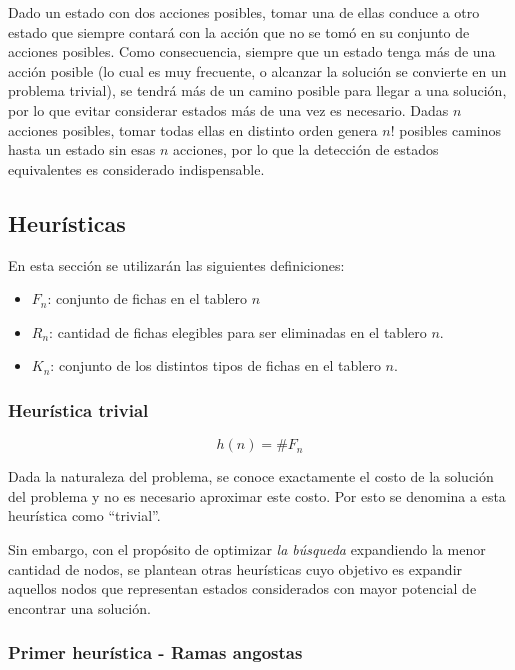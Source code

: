\documentclass[a4paper,10pt]{article}
\begin{document}
    Dado un estado con dos acciones posibles, tomar una de ellas conduce a otro estado que siempre contará con la acción que no se tomó en su conjunto de acciones posibles. Como consecuencia, siempre que un estado tenga más de una acción posible (lo cual es muy frecuente, o alcanzar la solución se convierte en un problema trivial), se tendrá más de un camino posible para llegar a una solución, por lo que evitar considerar estados más de una vez es necesario. Dadas $n$ acciones posibles, tomar todas ellas en distinto orden genera $n!$ posibles caminos hasta un estado sin esas $n$ acciones, por lo que la detección de estados equivalentes es considerado indispensable.

\subsection{Heurísticas}

    En esta sección se utilizarán las siguientes definiciones:

    \begin{itemize}
        \item $F_n$: conjunto de fichas en el tablero $n$
        \item $R_n$: cantidad de fichas elegibles para ser eliminadas en el tablero $n$.
        \item $K_n$: conjunto de los distintos tipos de fichas en el tablero $n$.
    \end{itemize}

    \subsubsection{Heurística trivial}

    \[ h(n) = \# F_n \]

    Dada la naturaleza del problema, se conoce exactamente el costo de la solución del problema y no es necesario aproximar este costo. Por esto se denomina a esta heurística como ``trivial''.

    Sin embargo, con el propósito de optimizar \textit{la búsqueda} expandiendo la menor cantidad de nodos, se plantean otras heurísticas cuyo objetivo es expandir aquellos nodos que representan estados considerados con mayor potencial de encontrar una solución.

    \subsubsection{Primer heurística - Ramas angostas}
        
\end{document}
